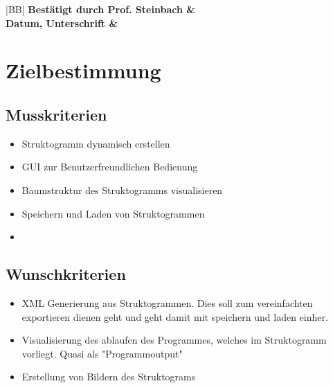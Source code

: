 \documentclass[a4paper,10pt]{report}
\begin{document}
\begin{titlepage}
\begin{center}
\begin{tabular}{|c|l|l|l|l|}
\end{tabular}
\end{center}

\vspace{10mm}

\begin{center}
\begin{tabular}{|BB|}
\hline
\bfseries \large Best\"{a}tigt durch Prof. Steinbach & \quad \quad \quad \quad \quad \quad \quad \quad \quad \\
\bfseries \large Datum, Unterschrift &
\\
\hline
\end{tabular}
\end{center}

\end{titlepage}

\newpage
\renewcommand{\thesection}{\arabic{section}}

\tableofcontents
\newpage
\section{Zielbestimmung}
\subsection{Musskriterien}
\begin{itemize}
\item Struktogramm dynamisch erstellen
\item GUI zur Benutzerfreundlichen Bedienung
\item Baumstruktur des Struktogramms visualisieren
\item Speichern und Laden von Struktogrammen
\item
\end{itemize}
\subsection{Wunschkriterien}
\begin{itemize}
\item XML Generierung aus Struktogrammen. Dies soll zum vereinfachten exportieren dienen geht und geht damit mit speichern und laden einher.
\item Visualisierung des ablaufen des Programmes, welches im Struktogramm vorliegt. Quasi als "Programmoutput"
\item Erstellung von Bildern des Struktograms
\end{itemize}
\end{document}
